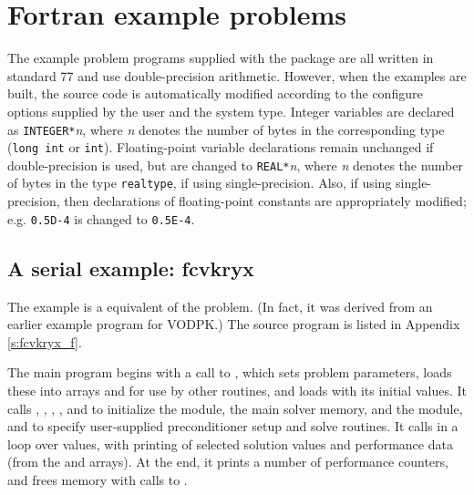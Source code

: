 \section{Fortran example problems}\label{s:ex_fortran}

The {\F} example problem programs supplied with the {\cvode}
package are all written in standard {\F}77 and use double-precision
arithmetic. However, when the {\F} examples are built, the source code is
automatically modified according to the configure options supplied by the
user and the system type. Integer variables are declared as {\tt INTEGER*}{\em n},
where {\em n} denotes the number of bytes in the corresponding {\C} type
({\tt long int} or {\tt int}). Floating-point variable declarations remain
unchanged if double-precision is used, but are changed to {\tt REAL*}{\em n},
where {\em n} denotes the number of bytes in the {\sundials} type {\tt realtype},
if using single-precision. Also, if using single-precision, then declarations of
floating-point constants are appropriately modified; e.g. {\tt 0.5D-4} is
changed to {\tt 0.5E-4}.


\subsection{A serial example: fcvkryx}\label{ss:fcvkryx}

The  example is a {\F} equivalent of the  problem.
(In fact, it was derived from an earlier {\F} example program for VODPK.)
The source program  is listed in Appendix \ref{s:fcvkryx_f}.

The main program begins with a call to , which sets problem
parameters, loads these into arrays  and  for use by other
routines, and loads  with its initial values.  It calls ,
, , , and  to
initialize the {\nvecs} module, the main solver memory, and the {\cvspgmr} module,
and to specify user-supplied preconditioner setup and solve routines.
It calls  in a loop over  values, with printing of
selected solution values and performance data (from the   and 
arrays).  At the end, it prints a number of performance counters, and
frees memory with calls to .


